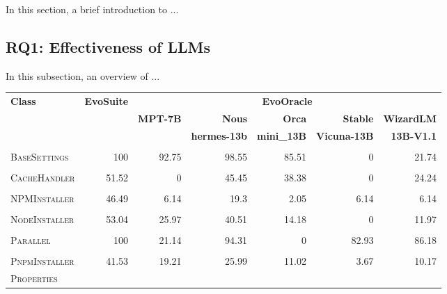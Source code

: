In this section, a brief introduction to ... 

\vspace{0.1 cm}
\subsection{RQ1: Effectiveness of LLMs}
\label{sec:results_rq1}
\vspace{0.1 cm}

In this subsection, an overview of ...




\begin{table}[H]
\centering

\begin{tabular}{| l | r | r | r | r | r | r |}
\hline
\multirow{2}{*}{\textbf{Class}} & \multirow{2}{*}{\textbf{EvoSuite}} & \multicolumn{5}{c|}{\textbf{EvoOracle}} \\ %
\cline{3-7} %
 &  & \textbf{MPT-7B} & \textbf{Nous} & \textbf{Orca} & \textbf{Stable} & \textbf{WizardLM} \\
 &  &  & \textbf{hermes-13b} & \textbf{mini\_13B} & \textbf{Vicuna-13B} & \textbf{13B-V1.1} \\
\hline
\scriptsize\textsc{} &  &  &  &  &  &  \\
\scriptsize\textsc{BaseSettings} & 100 & 92.75 & 98.55 & 85.51 & 0 & 21.74 \\
\hline
\scriptsize\textsc{} &  &  &  &  &  &  \\
\scriptsize\textsc{CacheHandler} & 51.52 & 0 & 45.45 & 38.38 & 0 & 24.24 \\
\hline
\scriptsize\textsc{} &  &  &  &  &  &  \\
\scriptsize\textsc{NPMInstaller} & 46.49 & 6.14 & 19.3 & 2.05 & 6.14 & 6.14 \\
\hline
\scriptsize\textsc{} &  &  &  &  &  &  \\
\scriptsize\textsc{NodeInstaller} & 53.04 & 25.97 & 40.51 & 14.18 & 0 & 11.97 \\
\hline
\scriptsize\textsc{} &  &  &  &  &  &  \\
\scriptsize\textsc{Parallel} & 100 & 21.14 & 94.31 & 0 & 82.93 & 86.18 \\
\hline
\scriptsize\textsc{} &  &  &  &  &  &  \\
\scriptsize\textsc{PnpmInstaller} & 41.53 & 19.21 & 25.99 & 11.02 & 3.67 & 10.17 \\
\hline
\scriptsize\textsc{Properties} &  &  &  &  &  &  \\

\end{tabular}
\end{table}
